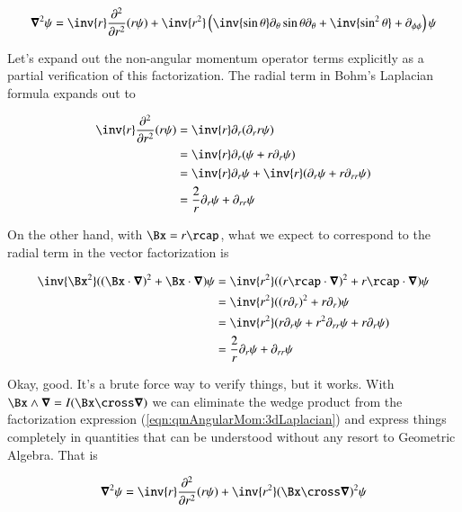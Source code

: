 \begin{align}\label{eqn:qmAngularMom:LaplacianRTP}
\spacegrad^2 \psi = \inv{r} \frac{\partial^2}{\partial r^2} (r\psi) + \inv{r^2} \left(
\inv{\sin\theta} \partial_\theta \sin\theta \partial_\theta + \inv{\sin^2\theta} + \partial_{\phi \phi} \right) \psi
\end{align}

Let's expand out the non-angular momentum operator terms explicitly as a partial verification of this factorization.  The radial term in Bohm's Laplacian formula expands out to

\begin{align*}
\inv{r} \frac{\partial^2}{\partial r^2} (r\psi) 
&=
\inv{r} \partial_r (\partial_r r \psi) \\
&=
\inv{r} \partial_r (\psi + r\partial_r \psi) \\
&=
\inv{r} \partial_r \psi + \inv{r}( \partial_r \psi + r \partial_{rr} \psi) \\
&=
\frac{2}{r} \partial_r \psi + \partial_{rr} \psi \\
\end{align*}

On the other hand, with $\Bx = r\rcap$, what we expect to correspond to the radial term in the vector factorization is

\begin{align*}
\inv{\Bx^2}( (\Bx \cdot \spacegrad)^2 + \Bx \cdot \spacegrad ) \psi
&=
\inv{r^2}( (r \rcap \cdot \spacegrad)^2 + r \rcap \cdot \spacegrad  ) \psi \\
&=
\inv{r^2}( (r \partial_r )^2 + r \partial_r  ) \psi \\
&=
\inv{r^2}( r \partial_r \psi + r^2 \partial_{rr} \psi + r \partial_r \psi ) \\
&=
\frac{2}{r} \partial_r \psi + \partial_{rr} \psi 
\end{align*}

Okay, good.  It's a brute force way to verify things, but it works.  With $\Bx \wedge \spacegrad = I (\Bx \cross \spacegrad)$ we can eliminate the wedge product from the factorization expression (\ref{eqn:qmAngularMom:3dLaplacian}) and express things completely in quantities that can be understood without any resort to Geometric Algebra.  That is

\begin{align}\label{eqn:qmAngularMom:LaplacianRadialCross}
\spacegrad^2 \psi = \inv{r} \frac{\partial^2}{\partial r^2} (r\psi) + \inv{r^2} (\Bx \cross \spacegrad)^2 \psi
\end{align}

